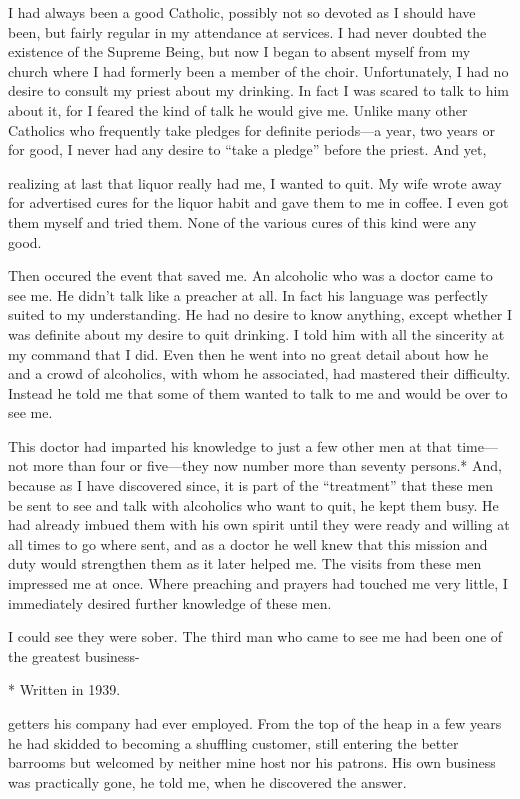 I had always been a good Catholic, possibly not so devoted as I should have been, but fairly regular in my attendance at services. I had never doubted the existence of the Supreme Being, but now I began to absent myself from my church where I had formerly been a member of the choir. Unfortunately, I had no desire to consult my priest about my drinking. In fact I was scared to talk to him about it, for I feared the kind of talk he would give me. Unlike many other Catholics who frequently take pledges for definite periods—a year, two years or for good, I never had any desire to “take a pledge” before the priest. And yet,

realizing at last that liquor really had me, I wanted to quit. My wife wrote away for advertised cures for the liquor habit and gave them to me in coffee. I even got them myself and tried them. None of the various cures of this kind were any good.

Then occured the event that saved me. An alcoholic who was a doctor came to see me. He didn’t talk like a preacher at all. In fact his language was perfectly suited to my understanding. He had no desire to know anything, except whether I was definite about my desire to quit drinking. I told him with all the sincerity at my command that I did. Even then he went into no great detail about how he and a crowd of alcoholics, with whom he associated, had mastered their difficulty. Instead he told me that some of them wanted to talk to me and would be over to see me.

This doctor had imparted his knowledge to just a few other men at that time—not more than four or five—they now number more than seventy persons.* And, because as I have discovered since, it is part of the “treatment” that these men be sent to see and talk with alcoholics who want to quit, he kept them busy. He had already imbued them with his own spirit until they were ready and willing at all times to go where sent, and as a doctor he well knew that this mission and duty would strengthen them as it later helped me. The visits from these men impressed me at once. Where preaching and prayers had touched me very little, I immediately desired further knowledge of these men.

I could see they were sober. The third man who came to see me had been one of the greatest business-

* Written in 1939.

getters his company had ever employed. From the top of the heap in a few years he had skidded to becoming a shuffling customer, still entering the better barrooms but welcomed by neither mine host nor his patrons. His own business was practically gone, he told me, when he discovered the answer.

